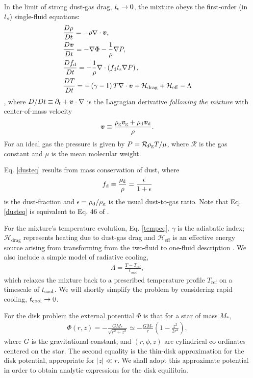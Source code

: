 In the limit of strong dust-gas drag, $t_\mathrm{s}\to0$, the mixture obeys 
the first-order (in $t_\mathrm{s}$) single-fluid equations: 
\begin{align} 
  &\frac{D\rho}{Dt} = -\rho\nabla\cdot\bm{v}, \label{masseq}\\ 
  &\frac{D\bm{v}}{Dt} = - \nabla\Phi - \frac{1}{\rho}\nabla  P, \label{momeq}\\ 
  &\frac{Df_\mathrm{d}}{Dt} = -\frac{1}{\rho} \nabla \cdot \left(f_\mathrm{d} 
  t_\mathrm{s} \nabla P \right),\label{dusteq}\\
  &\frac{D T}{D t} = - \left(\gamma-1\right)T\nabla\cdot\bm{v} +
  \mathcal{H}_\mathrm{drag} + \mathcal{H}_\mathrm{eff}  - \Lambda  \label{tempeq} 
\end{align}
\citep{laibe14}, where $D/Dt \equiv \partial_t + \bm{v}\cdot\nabla$ is the Lagragian
derivative \emph{following the mixture} with center-of-mass velocity  
\begin{align}
  \bm{v} \equiv \frac{\rho_\mathrm{g}\bm{v}_\mathrm{g} + 
    \rho_\mathrm{d}\bm{v}_\mathrm{d}}{\rho}. 
\end{align}
For an ideal gas the pressure is given
by $P = \mathcal{R}\rho_\mathrm{g} T/\mu $, where $\mathcal{R}$ is
the gas constant and $\mu$ is the mean molecular weight. 

Eq. \ref{dusteq} results from mass conservation of dust, where 
\begin{align}
  f_\mathrm{d} \equiv \frac{\rho_\mathrm{d}}{\rho}  = \frac{\epsilon}{1+\epsilon} 
\end{align}
is the dust-fraction and $\epsilon=\rho_\mathrm{d}/\rho_\mathrm{g}$ is the usual
dust-to-gas ratio. Note that Eq. \ref{dusteq} is 
equivalent to Eq. 46 of \cite{jacquet11}. 

For the mixture's temperature evolution, Eq. \ref{tempeq}, $\gamma$ is
the adiabatic index; $\mathcal{H}_\mathrm{drag}$ represents heating
due to dust-gas drag and $\mathcal{H}_\mathrm{eff}$ is an effective
energy source arising from transforming from the two-fluid to
one-fluid description \citep[see][ for details]{laibe14}. We also
include a simple model of radiative cooling,
\begin{align}
  \Lambda = \frac{T -
    T_\mathrm{ref}}{t_\mathrm{cool}}, \label{realenergy} 
\end{align}
which relaxes the mixture back to a prescribed temperature profile   
$T_\mathrm{ref}$ on a timescale of $t_\mathrm{cool}$. We will shortly simplify
the problem by considering rapid cooling, $t_\mathrm{cool}\to0$. 


For the disk problem the external potential $\Phi$ is  
that for a star of mass $M_*$, 
\begin{align}\label{thin_disk_potential}
  \Phi(r,z) =-\frac{GM_*}{\sqrt{r^2 + z^2}}\simeq
  -\frac{GM_*}{r}\left(1 - \frac{z^2}{2r^2}\right), 
\end{align}
where $G$ is the gravitational constant, and $(r,\phi, z)$ are
cylindrical co-ordinates centered on the star. 
The second equality is the 
thin-disk approximation for the disk potential, appropriate for
$|z|\ll r$. We shall adopt this approximate potential in order to
obtain analytic expressions for the disk equilibria.  

